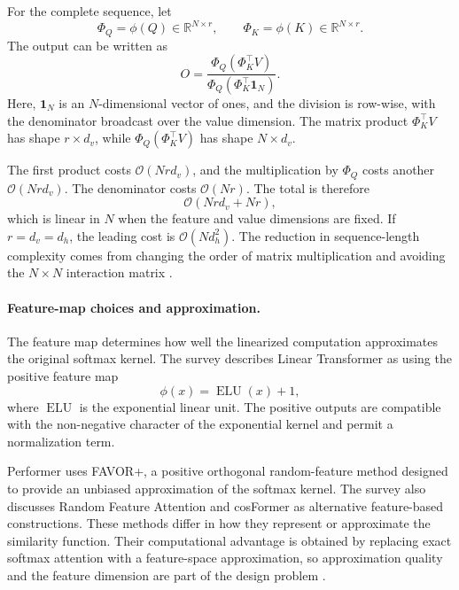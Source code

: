 For the complete sequence, let
\begin{equation}
    \Phi_Q=\phi(Q)\in\mathbb{R}^{N\times r},
    \qquad
    \Phi_K=\phi(K)\in\mathbb{R}^{N\times r}.
    \label{eq:attn-linear-feature-matrices}
\end{equation}
The output can be written as
\begin{equation}
    \boxed{
    O
    =
    \frac{
        \Phi_Q(\Phi_K^\top V)
    }{
        \Phi_Q(\Phi_K^\top\mathbf{1}_N)
    }
    }.
    \label{eq:attn-linear-matrix-form}
\end{equation}
Here, \(\mathbf{1}_N\) is an \(N\)-dimensional vector of ones, and the
division is row-wise, with the denominator broadcast over the value
dimension. The matrix product \(\Phi_K^\top V\) has shape
\(r\times d_v\), while \(\Phi_Q(\Phi_K^\top V)\) has shape
\(N\times d_v\).

The first product costs
\(\mathcal{O}(Nrd_v)\), and the multiplication by \(\Phi_Q\) costs
another \(\mathcal{O}(Nrd_v)\). The denominator costs
\(\mathcal{O}(Nr)\). The total is therefore
\begin{equation}
    \mathcal{O}(Nrd_v+Nr),
    \label{eq:attn-linear-complexity}
\end{equation}
which is linear in \(N\) when the feature and value dimensions are fixed.
If \(r=d_v=d_h\), the leading cost is
\(\mathcal{O}(Nd_h^2)\). The reduction in sequence-length complexity
comes from changing the order of matrix multiplication and avoiding
the \(N\times N\) interaction matrix
\parencite{sun2026efficientattention}.

\paragraph{Feature-map choices and approximation.}
The feature map determines how well the linearized computation
approximates the original softmax kernel. The survey describes Linear
Transformer as using the positive feature map
\begin{equation}
    \phi(x)=\operatorname{ELU}(x)+1,
    \label{eq:attn-linear-elu-feature}
\end{equation}
where \(\operatorname{ELU}\) is the exponential linear unit. The positive
outputs are compatible with the non-negative character of the
exponential kernel and permit a normalization term.

Performer uses FAVOR+, a positive orthogonal random-feature method
designed to provide an unbiased approximation of the softmax kernel.
The survey also discusses Random Feature Attention and cosFormer as
alternative feature-based constructions. These methods differ in how
they represent or approximate the similarity function. Their computational
advantage is obtained by replacing exact softmax attention with a
feature-space approximation, so approximation quality and the feature
dimension are part of the design problem
\parencite{sun2026efficientattention}.

